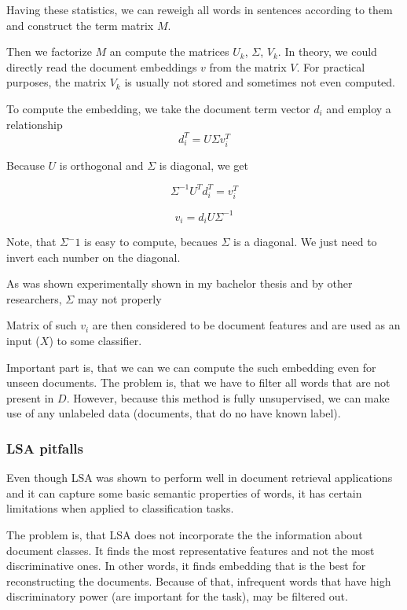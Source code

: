     Having these statistics, we can reweigh all words in sentences according to them and construct the term matrix $M$.
    
    Then we factorize $M$ an compute the matrices $U_k$, $\Sigma$, $V_k$. 
    In theory, we could directly read the document embeddings $v$ from the matrix $V$.
    For practical purposes, the matrix $V_k$ is usually not stored and sometimes not even computed. 
    
    To compute the embedding, we take the document term vector $d_i$ and employ a relationship $$d_i^T = U \Sigma v_i^T$$
    
    Because $U$ is orthogonal and $\Sigma$ is diagonal, we get
    
    $$\Sigma^{-1} U^T d_i^T = v_i^T $$

    $$v_i = d_i U \Sigma^{-1} $$
    
    Note, that $\Sigma^-1$ is easy to compute, becaues $\Sigma$ is a diagonal. 
    We just need to invert each number on the diagonal.  
    
    As was shown experimentally shown in my bachelor thesis \* %
    and by other researchers, $\Sigma$ may not properly 
    
    Matrix of such $v_i$ are then considered to be document features and are used as an input ($X$) to some classifier.
    
    Important part is, that we can we can compute the such embedding even for unseen documents.
    The problem is, that we have to filter all words that are not present in $D$. 
    However, because this method is fully unsupervised, we can make use of any unlabeled data (documents, that do no have known label).
    
    \subsubsection{LSA pitfalls}

    Even though LSA was shown to perform well in document retrieval applications and it can capture some basic semantic properties of words,
    it has certain limitations when applied to classification tasks. 
    
    The problem is, that LSA does not incorporate the the information about document classes. 
    It finds the most representative features and not the most discriminative ones.
    In other words, it finds embedding that is the best for reconstructing the documents.
    Because of that, infrequent words that have high discriminatory power (are important for the task), may be filtered out.
    
